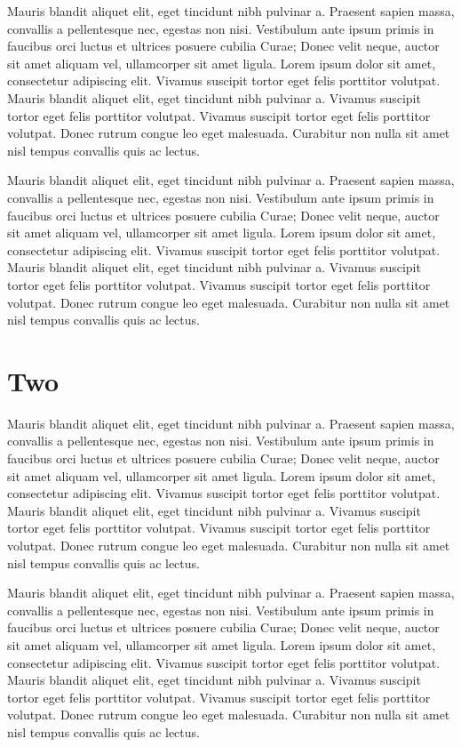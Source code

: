 \documentclass{scrbook}
\begin{document}
Mauris blandit aliquet elit, eget tincidunt nibh pulvinar a. Praesent
sapien massa, convallis a pellentesque nec, egestas non nisi. Vestibulum
ante ipsum primis in faucibus orci luctus et ultrices posuere cubilia
Curae; Donec velit neque, auctor sit amet aliquam vel, ullamcorper sit
amet ligula. Lorem ipsum dolor sit amet, consectetur adipiscing elit.
Vivamus suscipit tortor eget felis porttitor volutpat. Mauris blandit
aliquet elit, eget tincidunt nibh pulvinar a. Vivamus suscipit tortor
eget felis porttitor volutpat. Vivamus suscipit tortor eget felis
porttitor volutpat. Donec rutrum congue leo eget malesuada. Curabitur
non nulla sit amet nisl tempus convallis quis ac lectus.

Mauris blandit aliquet elit, eget tincidunt nibh pulvinar a. Praesent
sapien massa, convallis a pellentesque nec, egestas non nisi. Vestibulum
ante ipsum primis in faucibus orci luctus et ultrices posuere cubilia
Curae; Donec velit neque, auctor sit amet aliquam vel, ullamcorper sit
amet ligula. Lorem ipsum dolor sit amet, consectetur adipiscing elit.
Vivamus suscipit tortor eget felis porttitor volutpat. Mauris blandit
aliquet elit, eget tincidunt nibh pulvinar a. Vivamus suscipit tortor
eget felis porttitor volutpat. Vivamus suscipit tortor eget felis
porttitor volutpat. Donec rutrum congue leo eget malesuada. Curabitur
non nulla sit amet nisl tempus convallis quis ac lectus.

\hypertarget{c3-c3-two}{%
\section{Two}\label{c3-c3-two}}

Mauris blandit aliquet elit, eget tincidunt nibh pulvinar a. Praesent
sapien massa, convallis a pellentesque nec, egestas non nisi. Vestibulum
ante ipsum primis in faucibus orci luctus et ultrices posuere cubilia
Curae; Donec velit neque, auctor sit amet aliquam vel, ullamcorper sit
amet ligula. Lorem ipsum dolor sit amet, consectetur adipiscing elit.
Vivamus suscipit tortor eget felis porttitor volutpat. Mauris blandit
aliquet elit, eget tincidunt nibh pulvinar a. Vivamus suscipit tortor
eget felis porttitor volutpat. Vivamus suscipit tortor eget felis
porttitor volutpat. Donec rutrum congue leo eget malesuada. Curabitur
non nulla sit amet nisl tempus convallis quis ac lectus.

Mauris blandit aliquet elit, eget tincidunt nibh pulvinar a. Praesent
sapien massa, convallis a pellentesque nec, egestas non nisi. Vestibulum
ante ipsum primis in faucibus orci luctus et ultrices posuere cubilia
Curae; Donec velit neque, auctor sit amet aliquam vel, ullamcorper sit
amet ligula. Lorem ipsum dolor sit amet, consectetur adipiscing elit.
Vivamus suscipit tortor eget felis porttitor volutpat. Mauris blandit
aliquet elit, eget tincidunt nibh pulvinar a. Vivamus suscipit tortor
eget felis porttitor volutpat. Vivamus suscipit tortor eget felis
porttitor volutpat. Donec rutrum congue leo eget malesuada. Curabitur
non nulla sit amet nisl tempus convallis quis ac lectus.
\end{document}
